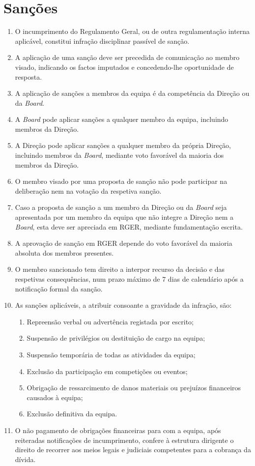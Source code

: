 \section{Sanções}
\begin{enumerate}
  \item O incumprimento do Regulamento Geral, ou de outra regulamentação interna aplicável, constitui infração disciplinar passível de sanção.
  \item A aplicação de uma sanção deve ser precedida de comunicação ao membro visado, indicando os factos imputados e concedendo-lhe oportunidade de resposta.
  \item A aplicação de sanções a membros da equipa é da competência da Direção ou da \textit{Board}.
  \item A \textit{Board} pode aplicar sanções a qualquer membro da equipa, incluindo membros da Direção.
  \item A Direção pode aplicar sanções a qualquer membro da própria Direção, incluindo membros da \textit{Board}, mediante voto favorável da maioria dos membros da Direção.
  \item O membro visado por uma proposta de sanção não pode participar na deliberação nem na votação da respetiva sanção.
  \item Caso a proposta de sanção a um membro da Direção ou da \textit{Board} seja apresentada por um membro da equipa que não integre a Direção nem a \textit{Board}, esta deve ser apreciada em RGER, mediante fundamentação escrita.
  \item A aprovação de sanção em RGER depende do voto favorável da maioria absoluta dos membros presentes.
  \item O membro sancionado tem direito a interpor recurso da decisão e das respetivas consequências, num prazo máximo de 7 dias de calendário após a notificação formal da sanção.
  \item As sanções aplicáveis, a atribuir consoante a gravidade da infração, são:
  \begin{enumerate}
    \item Repreensão verbal ou advertência registada por escrito;
    \item Suspensão de privilégios ou destituição de cargo na equipa;
    \item Suspensão temporária de todas as atividades da equipa;
    \item Exclusão da participação em competições ou eventos;
    \item Obrigação de ressarcimento de danos materiais ou prejuízos financeiros causados à equipa;
    \item Exclusão definitiva da equipa.
  \end{enumerate}
  \item O não pagamento de obrigações financeiras para com a equipa, após reiteradas notificações de incumprimento, confere à estrutura dirigente o direito de recorrer aos meios legais e judiciais competentes para a cobrança da dívida.
\end{enumerate}

